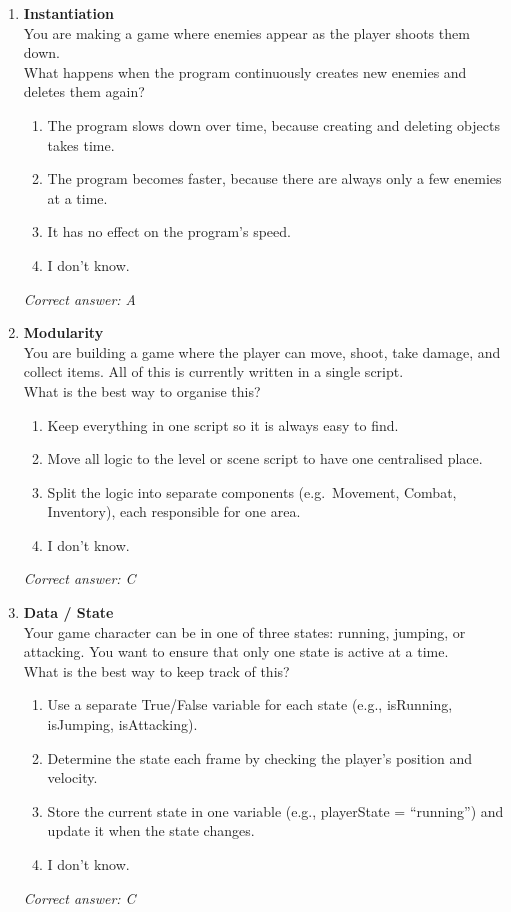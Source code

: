 \begin{enumerate}
	\item \textbf{Instantiation} \\
	      You are making a game where enemies appear as the player shoots them down. \\[0.5em]
	      What happens when the program continuously creates new enemies and deletes them again?
	      \begin{enumerate}
		      \item The program slows down over time, because creating and deleting objects takes time.
		      \item The program becomes faster, because there are always only a few enemies at a time.
		      \item It has no effect on the program's speed.
		      \item I don't know.
	      \end{enumerate}
	      \textit{Correct answer: A}

	\item \textbf{Modularity} \\
	      You are building a game where the player can move, shoot, take damage, and collect items. All of this is currently written in a single script. \\[0.5em]
	      What is the best way to organise this?
	      \begin{enumerate}
		      \item Keep everything in one script so it is always easy to find.
		      \item Move all logic to the level or scene script to have one centralised place.
		      \item Split the logic into separate components (e.g.\ Movement, Combat, Inventory), each responsible for one area.
		      \item I don't know.
	      \end{enumerate}
	      \textit{Correct answer: C}

	\item \textbf{Data / State} \\
	      Your game character can be in one of three states: running, jumping, or attacking. You want to ensure that only one state is active at a time. \\[0.5em]
	      What is the best way to keep track of this?
	      \begin{enumerate}
		      \item Use a separate True/False variable for each state (e.g., isRunning, isJumping, isAttacking).
		      \item Determine the state each frame by checking the player's position and velocity.
		      \item Store the current state in one variable (e.g., playerState = ``running'') and update it when the state changes.
		      \item I don't know.
	      \end{enumerate}
	      \textit{Correct answer: C}


\end{enumerate}

